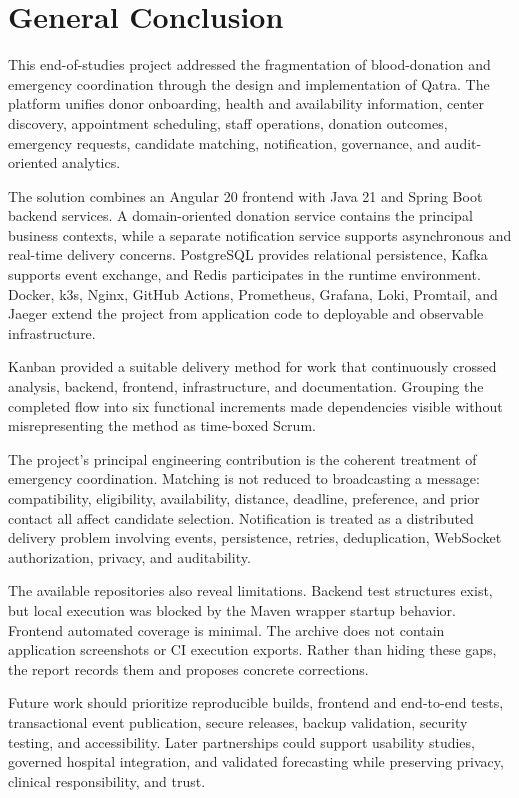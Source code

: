 \chapter*{General Conclusion}

This end-of-studies project addressed the fragmentation of blood-donation and emergency coordination through the design and implementation of Qatra. The platform unifies donor onboarding, health and availability information, center discovery, appointment scheduling, staff operations, donation outcomes, emergency requests, candidate matching, notification, governance, and audit-oriented analytics.

The solution combines an Angular 20 frontend with Java 21 and Spring Boot backend services. A domain-oriented donation service contains the principal business contexts, while a separate notification service supports asynchronous and real-time delivery concerns. PostgreSQL provides relational persistence, Kafka supports event exchange, and Redis participates in the runtime environment. Docker, k3s, Nginx, GitHub Actions, Prometheus, Grafana, Loki, Promtail, and Jaeger extend the project from application code to deployable and observable infrastructure.

Kanban provided a suitable delivery method for work that continuously crossed analysis, backend, frontend, infrastructure, and documentation. Grouping the completed flow into six functional increments made dependencies visible without misrepresenting the method as time-boxed Scrum.

The project's principal engineering contribution is the coherent treatment of emergency coordination. Matching is not reduced to broadcasting a message: compatibility, eligibility, availability, distance, deadline, preference, and prior contact all affect candidate selection. Notification is treated as a distributed delivery problem involving events, persistence, retries, deduplication, WebSocket authorization, privacy, and auditability.

The available repositories also reveal limitations. Backend test structures exist, but local execution was blocked by the Maven wrapper startup behavior. Frontend automated coverage is minimal. The archive does not contain application screenshots or CI execution exports. Rather than hiding these gaps, the report records them and proposes concrete corrections.

Future work should prioritize reproducible builds, frontend and end-to-end tests, transactional event publication, secure releases, backup validation, security testing, and accessibility. Later partnerships could support usability studies, governed hospital integration, and validated forecasting while preserving privacy, clinical responsibility, and trust.
